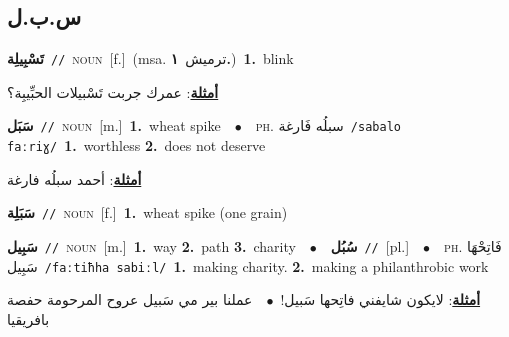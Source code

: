 \documentclass[10pt,a4paper,twoside]{article} %
\begin{document}
\begin{multicols}{2}
{{{{{{{{{{\vspace{-3mm}
\subsection*{\color{blue}\foreignlanguage{arabic}{س.ب.ل}\color{blue}{}} 

{\setlength\topsep{0pt}\textbf{\foreignlanguage{arabic}{تَسْبِيلِة}}\ {\color{gray}\texttt{//}\color{black}}\ \textsc{noun}\ [f.]\ \color{gray}(msa. \foreignlanguage{arabic}{ترميش}~\foreignlanguage{arabic}{\textbf{١.}})\color{black}\ \textbf{1.}~blink\  \begin{flushright}\color{gray}\foreignlanguage{arabic}{\textbf{\underline{\foreignlanguage{arabic}{أمثلة}}}: عمرك جربت تَسْبيلات الحبِّيبِة؟}\end{flushright}\color{black}} \vspace{2mm}

{\setlength\topsep{0pt}\textbf{\foreignlanguage{arabic}{سَبَل}}\ {\color{gray}\texttt{//}\color{black}}\ \textsc{noun}\ [m.]\ \textbf{1.}~wheat spike\ \ $\bullet$\ \ \textsc{ph.} \color{gray} \foreignlanguage{arabic}{سبلُه فَارغة}\color{black}\ {\color{gray}\texttt{/{\sffamily sabalo faːriɣ}/}\color{black}}\ \textbf{1.}~worthless  \textbf{2.}~does not deserve\  \begin{flushright}\color{gray}\foreignlanguage{arabic}{\textbf{\underline{\foreignlanguage{arabic}{أمثلة}}}: أحمد سبلُه فارغة}\end{flushright}\color{black}} \vspace{2mm}

{\setlength\topsep{0pt}\textbf{\foreignlanguage{arabic}{سَبَلِة}}\ {\color{gray}\texttt{//}\color{black}}\ \textsc{noun}\ [f.]\ \textbf{1.}~wheat spike (one grain)\ 

{\setlength\topsep{0pt}\textbf{\foreignlanguage{arabic}{سَبِيل}}\ {\color{gray}\texttt{//}\color{black}}\ \textsc{noun}\ [m.]\ \textbf{1.}~way  \textbf{2.}~path  \textbf{3.}~charity\ \ $\bullet$\ \ \setlength\topsep{0pt}\textbf{\foreignlanguage{arabic}{سُبُل}}\ {\color{gray}\texttt{//}\color{black}}\ [pl.]\ \ $\bullet$\ \ \textsc{ph.} \color{gray} \foreignlanguage{arabic}{فَاتِحْهَا سَبِيل}\color{black}\ {\color{gray}\texttt{/{\sffamily faːtiħha sabiːl}/}\color{black}}\ \textbf{1.}~making charity.  \textbf{2.}~making a philanthrobic work\  \begin{flushright}\color{gray}\foreignlanguage{arabic}{\textbf{\underline{\foreignlanguage{arabic}{أمثلة}}}: لايكون شايفني فاتِحها سَبيل!\ $\bullet$\ \  عملنا بير مي سَبيل عروح المرحومة حفصة بافريقيا}\end{flushright}\color{black}} \vspace{2mm}

}}}}}}}}}}}
\end{multicols}
\end{document}

